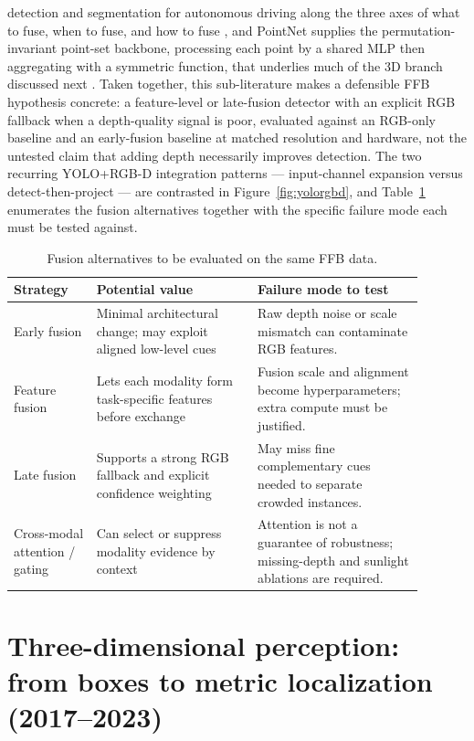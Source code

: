 detection and segmentation for autonomous driving along the three axes of what to fuse, when to fuse, and how to fuse \cite{feng2021multimodalsurvey}, and PointNet supplies the permutation-invariant point-set backbone, processing each point by a shared MLP then aggregating with a symmetric function, that underlies much of the 3D branch discussed next \cite{qi2017pointnet}. Taken together, this sub-literature makes a defensible FFB hypothesis concrete: a feature-level or late-fusion detector with an explicit RGB fallback when a depth-quality signal is poor, evaluated against an RGB-only baseline and an early-fusion baseline at matched resolution and hardware, not the untested claim that adding depth necessarily improves detection. The two recurring YOLO+RGB-D integration patterns --- input-channel expansion versus detect-then-project --- are contrasted in Figure~\ref{fig:yolorgbd}, and Table~\ref{tab:fusion} enumerates the fusion alternatives together with the specific failure mode each must be tested against.

\begin{table}[t]
\centering\small
\caption{Fusion alternatives to be evaluated on the same FFB data.}
\label{tab:fusion}
\begin{tabular}{p{0.18\linewidth}p{0.35\linewidth}p{0.36\linewidth}}
\toprule
Strategy & Potential value & Failure mode to test \\
\midrule
Early fusion & Minimal architectural change; may exploit aligned low-level cues & Raw depth noise or scale mismatch can contaminate RGB features. \\
Feature fusion & Lets each modality form task-specific features before exchange & Fusion scale and alignment become hyperparameters; extra compute must be justified. \\
Late fusion & Supports a strong RGB fallback and explicit confidence weighting & May miss fine complementary cues needed to separate crowded instances. \\
Cross-modal attention / gating & Can select or suppress modality evidence by context & Attention is not a guarantee of robustness; missing-depth and sunlight ablations are required. \\
\bottomrule
\end{tabular}
\end{table}

\section{Three-dimensional perception: from boxes to metric localization (2017--2023)}

